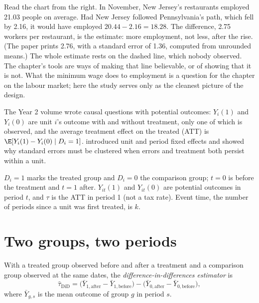 Read the chart from the right. In November, New Jersey's restaurants employed
21.03 people on average. Had New Jersey followed Pennsylvania's path, which fell
by 2.16, it would have employed $20.44 - 2.16 = 18.28$. The difference, 2.75
workers per restaurant, is the estimate: more employment, not less, after the
rise. %
(The paper prints 2.76, with a standard error of 1.36, computed from unrounded
means.) %
The whole estimate rests on the dashed line, which nobody observed. The
chapter's tools are ways of making that line believable, or of showing that
it is not. What the minimum wage does to employment is a question for the
chapter on the labour market; here the study serves only as the cleanest
picture of the design.

\begin{recall}
The Year 2 volume wrote causal questions with potential outcomes: $Y_i(1)$ and
$Y_i(0)$ are unit $i$'s outcome with and without treatment, only one of which is
observed, and the average treatment effect on the treated (ATT) is $\E[Y_i(1) -
Y_i(0) \mid D_i = 1]$.  introduced unit and period
fixed effects and showed why standard errors must be clustered when errors and
treatment both persist within a unit.
\end{recall}

\begin{notation}\label{not:b3:difference-in-differences:symbols}
$D_i = 1$ marks the treated group and $D_i = 0$ the comparison group; $t = 0$ is
before the treatment and $t = 1$ after. $Y_{it}(1)$ and $Y_{it}(0)$ are potential
outcomes in period $t$, and $\tau$ is the ATT in period 1 (not a tax rate). Event time, the number
of periods since a unit was first treated, is $k$.
\end{notation}

\section{Two groups, two periods}\label{sec:b3:difference-in-differences:two-by-two}

\begin{definition}\label{def:b3:difference-in-differences:did}
With a treated group observed before and after a treatment and a comparison
group observed at the same dates, the \emph{difference-in-differences
estimator} is
\[
  \hat\tau_{\mathrm{DiD}} = \bigl(\bar Y_{1,\mathrm{after}} - \bar Y_{1,\mathrm{before}}\bigr)
  - \bigl(\bar Y_{0,\mathrm{after}} - \bar Y_{0,\mathrm{before}}\bigr),
\]
where $\bar Y_{g,s}$ is the mean outcome of group $g$ in period $s$.
\end{definition}

